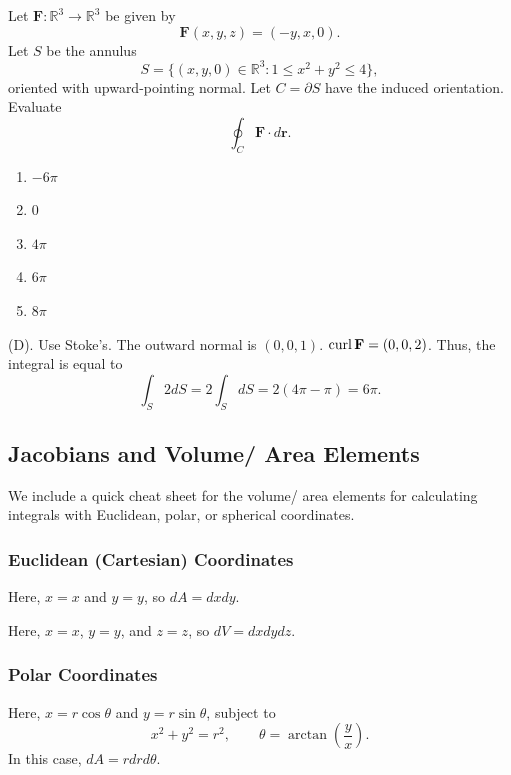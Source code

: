 \begin{exercise}
Let $\mathbf{F}:\mathbb{R}^3\to\mathbb{R}^3$
be given by
\[
\mathbf{F}(x,y,z)=(-y,x,0).
\]
Let $S$ be the annulus
\[
S=
\{(x,y,0)\in\mathbb{R}^3:
1\leq x^2+y^2\leq4\},
\]
oriented with upward-pointing normal. Let $C=\partial S$ have the induced
orientation. Evaluate
\[
\oint_C\mathbf{F}\cdot d\mathbf{r}.
\]
\begin{enumerate}[label=(\Alph*)]
\item $-6\pi$
\item $0$
\item $4\pi$
\item $6\pi$
\item $8\pi$
\end{enumerate}
\end{exercise}
\begin{solution}
(D). Use Stoke's. The outward normal is $(0,0,1)$. $\operatorname{curl} \mathbf{F} = (0,0,2)$.
Thus, the integral is equal to 
\[
\int_S 2dS = 2\int_S dS = 2(4\pi - \pi) = 6\pi.
\]
\end{solution}


\subsection{Jacobians and Volume/ Area Elements}

We include a quick cheat sheet for the volume/ area elements for calculating integrals 
with Euclidean, polar, or spherical coordinates.

\subsubsection{Euclidean (Cartesian) Coordinates}

\begin{example}[$\R^2$]
Here, $x=x$ and $y = y$, so $dA = dxdy$.
\end{example}
\begin{example}[$\R^3$]
Here, $x=x$, $y = y$, and $z = z$, so $dV = dxdydz$.
\end{example}



\subsubsection{Polar Coordinates}

\begin{example}[$\R^2$]
Here, $x = r \cos \theta$ and $y = r \sin \theta$, subject to
\[
x^2 + y^ 2= r^2, \qquad \theta = \arctan \left(\frac{y}{x}\right).
\]
In this case, $dA = r dr d\theta$.
\end{example}

